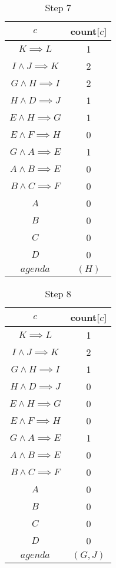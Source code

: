 \documentclass[12pt]{article}
\begin{document}
\begin{itemize}
\begin{table}[H]
\centering
\caption*{Step 7}
\label{my-label1}
\begin{tabular}{ c c }
\hline
$c$ & count[$c$]\\ \hline
$K \implies L$ & 1\\
$I \land J \implies K$ & 2\\
$G \land H \implies I$ & 2\\
$H \land D \implies J$ & 1\\
$E \land H \implies G$ & 1\\
$E \land F \implies H$ & 0\\
$G \land A \implies E$ & 1\\
$A \land B \implies E$ & 0\\
$B \land C \implies F$ & 0\\
$A$ & 0\\
$B$ & 0\\
$C$ & 0\\
$D$ & 0\\ \hline
$agenda$ & $(H)$
\end{tabular}
\end{table}
		
\begin{table}[H]
\centering
\caption*{Step 8}
\label{my-label1}
\begin{tabular}{ c c }
\hline
$c$ & count[$c$]\\ \hline
$K \implies L$ & 1\\
$I \land J \implies K$ & 2\\
$G \land H \implies I$ & 1\\
$H \land D \implies J$ & 0\\
$E \land H \implies G$ & 0\\
$E \land F \implies H$ & 0\\
$G \land A \implies E$ & 1\\
$A \land B \implies E$ & 0\\
$B \land C \implies F$ & 0\\
$A$ & 0\\
$B$ & 0\\
$C$ & 0\\
$D$ & 0\\ \hline
$agenda$ & $(G, J)$
\end{tabular}
\end{table}
		

\end{itemize}
\end{document}
